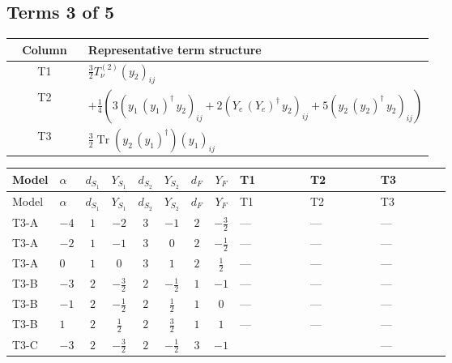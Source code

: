 \documentclass[8pt]{article}
\begin{document}
\begin{landscape}
\subsection*{Terms 3 of 5}
\begin{center}
\begin{tabular}{@{}c >{\raggedright\arraybackslash}p{0.82\linewidth}@{}}
\toprule
Column & Representative term structure \\
\midrule
T1 & \(\displaystyle \frac{3}{2} T_{\nu}^{(2)} \left({y_2}\right)_{ij}\) \\
\midrule
T2 & \(\displaystyle +\frac{1}{4} (3 \left({y_1}\,\left({y_1}\right)^{\dagger}\,{y_2}\right)_{ij}+2 \left({Y_e}\,\left({Y_e}\right)^{\dagger}\,{y_2}\right)_{ij}+5 \left({y_2}\,\left({y_2}\right)^{\dagger}\,{y_2}\right)_{ij})\) \\
\midrule
T3 & \(\displaystyle \frac{3}{2} \operatorname{Tr}\!\left({y_2}\,\left({y_1}\right)^{\dagger}\right) \left({y_1}\right)_{ij}\) \\
\midrule
\bottomrule
\end{tabular}
\end{center}
\smallskip
\tiny
\begin{longtable}{@{}llcccccc >{\raggedright\arraybackslash}p{0.21\linewidth} >{\raggedright\arraybackslash}p{0.21\linewidth} >{\raggedright\arraybackslash}p{0.21\linewidth}@{}}
\toprule
Model & $\alpha$ & $d_{S_1}$ & $Y_{S_1}$ & $d_{S_2}$ & $Y_{S_2}$ & $d_F$ & $Y_F$ & T1 & T2 & T3 \\
\midrule
\endfirsthead
\toprule
Model & $\alpha$ & $d_{S_1}$ & $Y_{S_1}$ & $d_{S_2}$ & $Y_{S_2}$ & $d_F$ & $Y_F$ & T1 & T2 & T3 \\
\midrule
\endhead
T3-A & $-4$ & $1$ & $-2$ & $3$ & $-1$ & $2$ & $-\frac{3}{2}$ & --- & --- & --- \\
\midrule
T3-A & $-2$ & $1$ & $-1$ & $3$ & $0$ & $2$ & $-\frac{1}{2}$ & --- & --- & --- \\
\midrule
T3-A & $0$ & $1$ & $0$ & $3$ & $1$ & $2$ & $\frac{1}{2}$ & --- & --- & --- \\
\midrule
T3-B & $-3$ & $2$ & $-\frac{3}{2}$ & $2$ & $-\frac{1}{2}$ & $1$ & $-1$ & --- & --- & --- \\
\midrule
T3-B & $-1$ & $2$ & $-\frac{1}{2}$ & $2$ & $\frac{1}{2}$ & $1$ & $0$ & --- & --- & --- \\
\midrule
T3-B & $1$ & $2$ & $\frac{1}{2}$ & $2$ & $\frac{3}{2}$ & $1$ & $1$ & --- & --- & --- \\
\midrule
T3-C & $-3$ & $2$ & $-\frac{3}{2}$ & $2$ & $-\frac{1}{2}$ & $3$ & $-1$ & \scriptsize\adjustbox{max width=\linewidth}{$\begin{gathered} \frac{3}{2} T_{\nu}^{(2)} \left({y_2}\right)_{ij}\end{gathered}$} & \scriptsize\adjustbox{max width=\linewidth}{$\begin{gathered} +\frac{1}{4} (3 \left({y_1}\,\left({y_1}\right)^{\dagger}\,{y_2}\right)_{ij}+2 \left({Y_e}\,\left({Y_e}\right)^{\dagger}\,{y_2}\right)_{ij}+5 \left({y_2}\,\left({y_2}\right)^{\dagger}\,{y_2}\right)_{ij})\end{gathered}$} & --- \\

\end{longtable}
\end{landscape}
\end{document}

